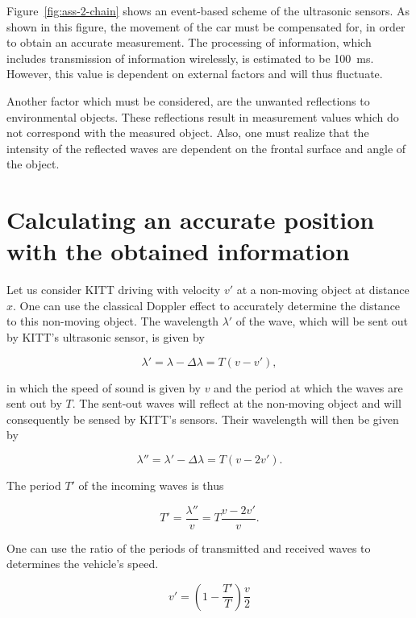 \documentclass[11pt,titlepage]{report}
\begin{document}
Figure~\ref{fig:ass-2-chain} shows an event-based scheme of the ultrasonic sensors. As shown in this figure, the movement of the car must be compensated for, in order to obtain an accurate measurement. The processing of information, which includes transmission of information wirelessly, is estimated to be \SI{100}{ms}. However, this value is dependent on external factors and will thus fluctuate.

Another factor which must be considered, are the unwanted reflections to environmental objects. These reflections result in measurement values which do not correspond with the measured object. Also, one must realize that the intensity of the reflected waves are dependent on the frontal surface and angle of the object. 

\section{Calculating an accurate position with the obtained information}
Let us consider KITT driving with velocity $v'$ at a non-moving object at distance $x$. One can use the classical Doppler effect to accurately determine the distance to this non-moving object. The wavelength $\lambda'$ of the wave, which will be sent out by KITT's ultrasonic sensor, is given by

\begin{equation}
	\lambda' = \lambda - \Delta \lambda = T (v - v'),
\end{equation}

in which the speed of sound is given by $v$ and the period at which the waves are sent out by $T$. The sent-out waves will reflect at the non-moving object and will consequently be sensed by KITT's sensors. Their wavelength will then be given by

\begin{equation}
	\lambda'' = \lambda' - \Delta \lambda = T (v - 2 v').
\end{equation}

The period $T'$ of the incoming waves is thus

\begin{equation}
	T' = \frac{\lambda''}{v} = T \frac{v - 2 v'}{v}.
\end{equation}

One can use the ratio of the periods of transmitted and received waves to determines the vehicle's speed.

\begin{equation} \label{eq:ass-2-vel-car}
 	v' = \left(1-\frac{T'}{T} \right) \frac{v}{2}
 \end{equation}
\end{document}
